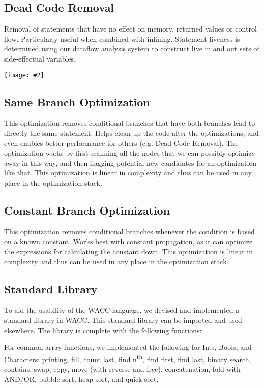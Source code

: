 \documentclass{article}
\newcommand{\centerimage}[2]{\begin{center}
    \texttt{[image: \#2]}
\end{center}}
\begin{document}
        \subsection*{Dead Code Removal}
        Removal of statements that have no effect on memory, returned values or control flow. Particularly useful when combined with inlining. Statement liveness is determined using our dataflow analysis system to construct live in and out sets of side-effectual variables.
        \centerimage{0.7}{dead code}
        
        \subsection*{Same Branch Optimization}
        This optimization removes conditional branches that have both branches lead to directly the same statement. Helps clean up the code after the optimizations, and even enables better performance for others (e.g. Dead Code Removal). The optimization works by first scanning all the nodes that we can possibly optimize away in this way, and then flagging potential new candidates for an optimization like that. This optimization is linear in complexity and thus can be used in any place in the optimization stack.
        
        \subsection*{Constant Branch Optimization}
        This optimization removes conditional branches whenever the condition is based on a known constant. Works best with constant propagation, as it can optimize the expressions for calculating the constant down. This optimization is linear in complexity and thus can be used in any place in the optimization stack.
        
        \subsection*{Standard Library}
        To aid the usability of the WACC language, we devised and implemented a standard library in WACC. This standard library can be imported and used elsewhere. The library is complete with the following functions:
    
        For common array functions, we implemented the following for Ints, Bools, and Characters: printing, fill, count last, find n\textsuperscript{th}, find first, find last, binary search, contains, swap, copy, move (with reverse and free), concatenation, fold with AND/OR, bubble sort, heap sort, and quick sort.
        
\end{document}
